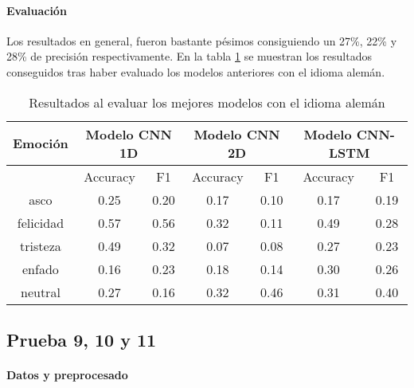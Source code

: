 \documentclass[11pt,a4paper,spanish]{book}
\begin{document}
	\paragraph{Evaluación}
	Los resultados en general, fueron bastante pésimos consiguiendo un 27\%, 22\% y 28\% de precisión respectivamente.
	En la tabla \ref{results_TestGerman} se muestran los resultados conseguidos tras haber evaluado los modelos anteriores con el idioma alemán.
	\begin{table}[H]
		\centering
		\begin{center}
			\begin{tabular}{| c|| c c |  c c |  c c | }
				\hline
				\multicolumn{1}{|c||}{Emoción} & 
				\multicolumn{2}{|c|}{Modelo CNN 1D}&
				\multicolumn{2}{|c|}{Modelo CNN 2D} &
				\multicolumn{2}{|c|}{Modelo CNN-LSTM} \\
				
				\hline
				& 
				\multicolumn{1}{|c|}{Accuracy}&\multicolumn{1}{|c|}{F1}&
				\multicolumn{1}{|c|}{Accuracy}&\multicolumn{1}{|c|}{F1}&
				\multicolumn{1}{|c|}{Accuracy}&\multicolumn{1}{|c|}{F1}\\
				\hline
				
				asco 		& 0.25 & 0.20 & 0.17 & 0.10 & 0.17 & 0.19 \\
				felicidad 	& 0.57 & 0.56 & 0.32 & 0.11 & 0.49 & 0.28 \\
				tristeza 	& 0.49 & 0.32 & 0.07 & 0.08 & 0.27 & 0.23 \\
				enfado 		& 0.16 & 0.23 & 0.18 & 0.14 & 0.30 & 0.26\\
				neutral 	& 0.27 & 0.16 & 0.32 & 0.46 & 0.31 & 0.40\\
				\hline
			\end{tabular}
			
			\caption{Resultados al evaluar los mejores modelos con el idioma alemán}
			\label{results_TestGerman}
		\end{center}
	\end{table}
	
	\subsection{Prueba 9, 10 y 11}
	
	\paragraph{Datos y preprocesado}
	
\end{document}

